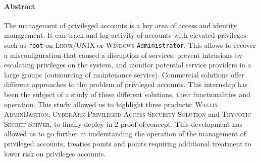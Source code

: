 
\paragraph{Abstract}
The management of privileged accounts is a key area of access and identity management. It can track and log activity of accounts with elevated privileges such as \texttt{root} on \textsc{Linux/UNIX} or \textsc{Windows} \texttt{Administrator}. This allows to recover a misconfiguration that caused a disruption of services, prevent intrusions by escalating privileges on the system, and monitor potential service providers in a large groups (outsourcing of maintenance service). Commercial solutions offer different approaches to the problem of privileged accounts. This internship has been the subject of a study of these different solutions, their functionalities and operation. This study allowed us to highlight three products: \textsc{Wallix AdminBastion}, \textsc{CyberArk Privileged Access Security Solution} and \textsc{Thycotic Secret Server}, to finally deploy in 2 proof of concept. This development has allowed us to go further in understanding the operation of the management of privileged accounts, treaties points and points requiring additional treatment to lower risk on privileges accounts.